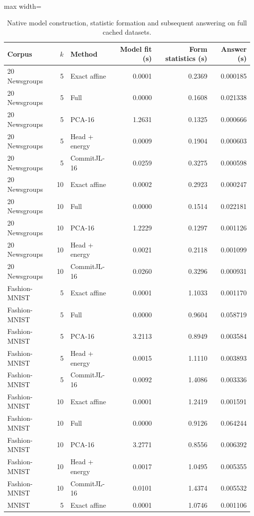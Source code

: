 \begin{table}[tp]
\caption{Native model construction, statistic formation and subsequent answering on full cached datasets.}\label{tab:native-times}
\centering\small
\begin{adjustbox}{max width=\textwidth}
\begin{tabular}{@{}lr l rrr@{}}
\toprule
Corpus & $k$ & Method & Model fit (s) & Form statistics (s) & Answer (s) \\
\midrule
20 Newsgroups & 5 & Exact affine & 0.0001 & 0.2369 & 0.000185 \\
20 Newsgroups & 5 & Full & 0.0000 & 0.1608 & 0.021338 \\
20 Newsgroups & 5 & PCA-16 & 1.2631 & 0.1325 & 0.000666 \\
20 Newsgroups & 5 & Head + energy & 0.0009 & 0.1904 & 0.000603 \\
20 Newsgroups & 5 & CommitJL-16 & 0.0259 & 0.3275 & 0.000598 \\
20 Newsgroups & 10 & Exact affine & 0.0002 & 0.2923 & 0.000247 \\
20 Newsgroups & 10 & Full & 0.0000 & 0.1514 & 0.022181 \\
20 Newsgroups & 10 & PCA-16 & 1.2229 & 0.1297 & 0.001126 \\
20 Newsgroups & 10 & Head + energy & 0.0021 & 0.2118 & 0.001099 \\
20 Newsgroups & 10 & CommitJL-16 & 0.0260 & 0.3296 & 0.000931 \\
Fashion-MNIST & 5 & Exact affine & 0.0001 & 1.1033 & 0.001170 \\
Fashion-MNIST & 5 & Full & 0.0000 & 0.9604 & 0.058719 \\
Fashion-MNIST & 5 & PCA-16 & 3.2113 & 0.8949 & 0.003584 \\
Fashion-MNIST & 5 & Head + energy & 0.0015 & 1.1110 & 0.003893 \\
Fashion-MNIST & 5 & CommitJL-16 & 0.0092 & 1.4086 & 0.003336 \\
Fashion-MNIST & 10 & Exact affine & 0.0001 & 1.2419 & 0.001591 \\
Fashion-MNIST & 10 & Full & 0.0000 & 0.9126 & 0.064244 \\
Fashion-MNIST & 10 & PCA-16 & 3.2771 & 0.8556 & 0.006392 \\
Fashion-MNIST & 10 & Head + energy & 0.0017 & 1.0495 & 0.005355 \\
Fashion-MNIST & 10 & CommitJL-16 & 0.0101 & 1.4374 & 0.005532 \\
MNIST & 5 & Exact affine & 0.0001 & 1.0746 & 0.001106 \\

\end{tabular}
\end{adjustbox}
\end{table}
